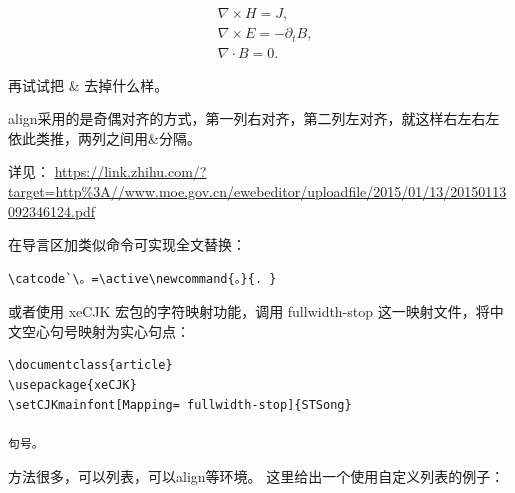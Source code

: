 

\begin{example}
\begin{align}
& \nabla \times H = J,\\
& \nabla \times E = - \partial _t B,\\
& \nabla \cdot B = 0.
\end{align}
\end{example}

再试试把 \& 去掉什么样。

align采用的是奇偶对齐的方式，第一列右对齐，第二列左对齐，就这样右左右左依此类推，两列之间用\&分隔。



详见：
\url{https://link.zhihu.com/?target=http\%3A//www.moe.gov.cn/ewebeditor/uploadfile/2015/01/13/20150113092346124.pdf}

在导言区加类似命令可实现全文替换：

\begin{verbatim}
\catcode`\。=\active\newcommand{。}{. }
\end{verbatim}

或者使用 xeCJK 宏包的字符映射功能，调用 fullwidth-stop
这一映射文件，将中文空心句号映射为实心句点：

\begin{verbatim}
\documentclass{article}
\usepackage{xeCJK}
\setCJKmainfont[Mapping= fullwidth-stop]{STSong}

句号。

\end{verbatim}



方法很多，可以列表，可以align等环境。 这里给出一个使用自定义列表的例子：

